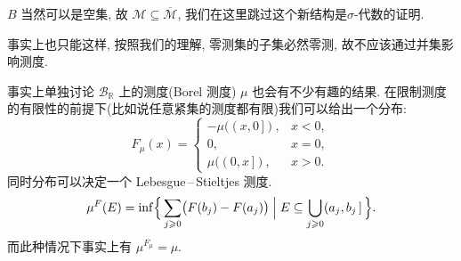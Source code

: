 \begin{alterendnote}
    $B$ 当然可以是空集, 故 $\mathcal M\subseteq\overline{\mathcal M}$, 我们在这里跳过这个新结构是$\sigma $-代数的证明.
\end{alterendnote}
\begin{alterendnote}
    事实上也只能这样, 按照我们的理解, 零测集的子集必然零测, 故不应该通过并集影响测度.
\end{alterendnote}
\begin{alterendnote}
    事实上单独讨论 $\mathcal B_{\mathbb R}$ 上的测度(Borel 测度) $\mu $ 也会有不少有趣的结果. 在限制测度的有限性的前提下(比如说任意紧集的测度都有限)我们可以给出一个分布:\[F_\mu(x) = \begin{cases}
            -\mu ((x,0\,]), & x<0, \\
            0,              & x=0, \\
            \mu ((0,x\,]),  & x>0.
        \end{cases}\]同时分布可以决定一个 Lebesgue\,--\,Stieltjes 测度.
    \[\mu^F (E)=\inf\Bigl\{ \,\sum_{j\geqslant 0}\bigl(F(b_j)-F(a_j)\bigr)\Bigm| E\subseteq\bigcup_{j\geqslant 0}(a_j,b_j\,]\, \Bigr\}.\]
    而此种情况下事实上有 $\mu ^{F_\mu}=\mu $.


\end{alterendnote}
